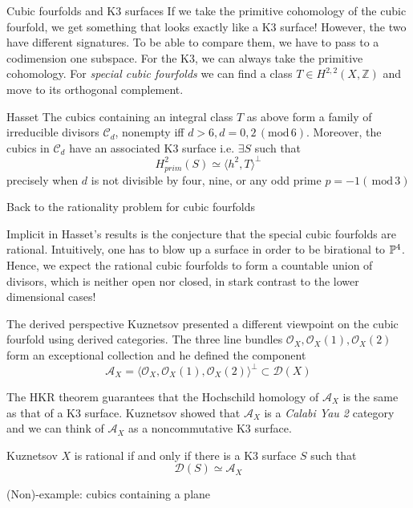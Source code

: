 \documentclass[10pt]{beamer}
\begin{document}
\begin{frame}{Cubic fourfolds and K3 surfaces}
    If we take the primitive cohomology of the cubic fourfold, we get something that looks exactly like a K3 surface! However, the two have different signatures.
    To be able to compare them, we have to pass to a codimension one subspace. For the K3, we can always take the primitive cohomology. \pause For \emph{special cubic fourfolds} we can find a class $T\in H^{2,2}(X,\mathbb{Z})$ and move to its orthogonal complement.\pause

    \begin{colorthm}{Hasset}{}
        The cubics containing an integral class $T$ as above form a family of irreducible divisors $\mathcal{C}_d$, nonempty iff $d>6, d=0,2 \,( \mathrm{mod}\, 6)$. Moreover, the cubics in $\mathcal{C}_d$ have an associated K3 surface i.e. $\exists S$ such that $$H^2_{prim}(S)\simeq \langle h^2, T\rangle ^\perp$$
        precisely when $d$ is not divisible by four, nine, or any odd prime $p =-1(\,\mathrm{ mod }\, 3)$
    \end{colorthm}
\end{frame}

\begin{frame}{Back to the rationality problem for cubic fourfolds}

    Implicit in Hasset's results is the conjecture that the special cubic fourfolds are rational. Intuitively, one has to blow up a surface in order to be birational to $\P^4$. Hence, we expect the rational cubic fourfolds to form a countable union of divisors, which is neither open nor closed, in stark contrast to the lower dimensional cases!
    
\end{frame}

\begin{frame}{The derived perspective}
    Kuznetsov presented a different viewpoint on the cubic fourfold using derived categories. The three line bundles $\mathcal{O}_X, \mathcal{O}_X(1), \mathcal{O}_X(2)$ form an exceptional collection and he defined the component $$\mathcal{A}_X=\langle \mathcal{O}_X, \mathcal{O}_X(1), \mathcal{O}_X(2)\rangle ^\perp\subset \mathcal{D}(X)$$\pause

    The HKR theorem guarantees that the Hochschild homology of $\mathcal{A}_X$ is the same as that of a K3 surface. \pause Kuznetsov showed that $\mathcal{A}_X$ is a \emph{Calabi Yau 2} category and we can think of $\mathcal{A}_X$ as a noncommutative K3 surface.\pause

    \begin{colorconj}{Kuznetsov}{}
        $X$ is rational if and only if there is a K3 surface $S$ such that $$\mathcal{D}(S)\simeq \mathcal{A}_X$$
    \end{colorconj}
    
\end{frame}

\begin{frame}{(Non)-example: cubics containing a plane}
    
\end{frame}










    
\end{document}
